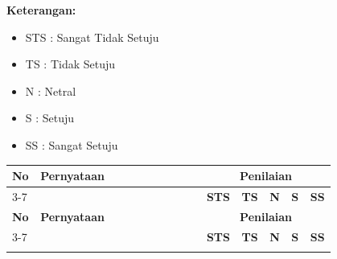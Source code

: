 \vspace{0.5cm}

\textbf{Keterangan:}
\begin{itemize}
      \item STS : Sangat Tidak Setuju
      \item TS : Tidak Setuju
      \item N : Netral
      \item S : Setuju
      \item SS : Sangat Setuju
\end{itemize}

\newpage

\label{annex:quality-in-use}

\begin{longtable}{|p{0.05\linewidth}|p{0.5\linewidth}|p{0.05\linewidth}|p{0.05\linewidth}|p{0.05\linewidth}|p{0.05\linewidth}|p{0.05\linewidth}|}
      \hline
      \textbf{No} & \textbf{Pernyataan}                                                                      & \multicolumn{5}{c|}{\textbf{Penilaian}}                                                       \\
      \cline{3-7}
                  &                                                                                          & \textbf{STS}                            & \textbf{TS} & \textbf{N} & \textbf{S} & \textbf{SS} \\
      \hline
      \endfirsthead

      \hline
      \textbf{No} & \textbf{Pernyataan}                                                                      & \multicolumn{5}{c|}{\textbf{Penilaian}}                                                       \\
      \cline{3-7}
                  &                                                                                          & \textbf{STS}                            & \textbf{TS} & \textbf{N} & \textbf{S} & \textbf{SS} \\
      \hline
      \endhead

      \hline
      \endfoot

      \hline
      \endlastfoot


\end{longtable}
